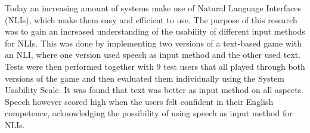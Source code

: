 Today an increasing amount of systems make use of Natural Language Interfaces (NLIs), which make them easy and efficient to use. The purpose of this research was to gain an increased understanding of the usability of different input methods for NLIs. This was done by implementing two versions of a text-based game with an NLI, where one version used speech as input method and the other used text. Tests were then performed together with 9 test users that all played through both versions of the game and then evaluated them individually using the System Usability Scale. It was found that text was better as input method on all aspects. Speech however scored high when the users felt confident in their English competence, acknowledging the possibility of using speech as input method for NLIs.